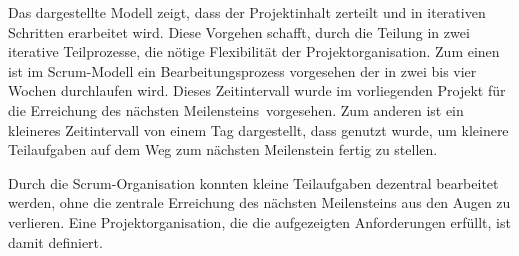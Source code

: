 Das dargestellte Modell zeigt, dass der Projektinhalt zerteilt und in iterativen Schritten erarbeitet wird. Diese
Vorgehen schafft, durch die Teilung in zwei iterative Teilprozesse, die nötige Flexibilität der Projektorganisation.
Zum einen ist im Scrum-Modell ein Bearbeitungsprozess vorgesehen
der in zwei bis vier Wochen durchlaufen wird. Dieses Zeitintervall wurde im vorliegenden Projekt für die Erreichung des
nächsten Meilensteins\footnotemark\ vorgesehen. Zum anderen ist ein kleineres Zeitintervall von einem Tag dargestellt, dass
genutzt wurde, um kleinere Teilaufgaben auf dem Weg zum nächsten Meilenstein fertig zu stellen.


Durch die Scrum-Organisation konnten kleine Teilaufgaben dezentral bearbeitet werden, ohne die zentrale Erreichung des
nächsten Meilensteins aus den Augen zu verlieren. Eine Projektorganisation, die die aufgezeigten Anforderungen
erfüllt, ist damit definiert.





